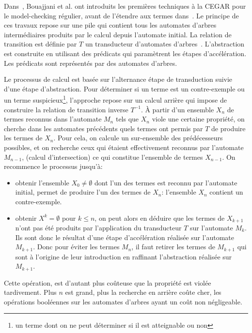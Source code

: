 Dans~\cite{DBLP:conf/cav/BouajjaniHV04}, Bouajjani et al. ont introduits les premières
techniques à la CEGAR pour le model-checking régulier, avant de
l'étendre aux termes dans~\cite{BouajjaniHRV-Infinity06,BouajjaniHRV-SAS06}. 
Le principe de ces travaux repose sur une pile qui contient tous les automates d'arbres
intermédiaires produits par le calcul depuis l'automate initial.
La relation de transition est définie par $T$ un transducteur d'automates
d'arbres~\cite{TATA}. L'abstraction est construite en utilisant des prédicats 
qui paramètrent les étapes d'accélération.
Les prédicats sont représentés par des automates d'arbres.

Le processus de calcul est basée sur l'alternance étape de transduction
suivie d'une étape d'abstraction. Pour déterminer si un terme
est un contre-exemple ou un terme suspicieux\footnote{\footnotesize un terme dont on ne peut
déterminer si il est atteignable ou non}, l'approche repose sur un
calcul arrière qui impose de construire la relation de transition
inverse $T^{-1}$. À partir d'un ensemble $X_n$ de termes reconnus dans l'automate $M_n$ tels que $X_n$
viole une certaine propriété, on cherche dans les automates précédents quels termes ont permis par $T$
de produire les termes de $X_n$. Pour cela, on calcule un sur-ensemble des prédécesseurs possibles, 
et on recherche ceux qui étaient effectivement reconnus par l'automate $M_{n-1}$, (calcul d'intersection)
ce qui constitue l'ensemble de termes $X_{n-1}$. On recommence le processus jusqu'à:
\begin{itemize}
\item obtenir l'ensemble $X_0 \not= \emptyset$ dont l'un des termes est reconnu par l'automate initial,
  permet de produire l'un des termes de $X_n$: l'ensemble  $X_n$ contient un contre-exemple.

\item obtenir $X^k = \emptyset$ pour $k \le n$, on peut alors en déduire 
  que les termes de $X_{k+1}$ n'ont pas été produits par l'application du transducteur $T$ sur l'automate $M_k$.
  Ils sont donc le résultat d'une étape d'accélération réalisée sur l'automate $M_{k+1}$.
  Donc pour éviter les termes $M_n$, il faut retirer les termes de $M_{k+1}$ qui sont
  à l'origine de leur introduction en raffinant l'abstraction réalisée sur $M_{k+1}$.
\end{itemize}
Cette opération, est d'autant plus coûteuse que la propriété est violée tardivement. 
Plus $n$ est grand, plus la recherche en arrière coûte cher, les opérations booléennes sur
les automates d'arbres ayant un coût non négligeable.


